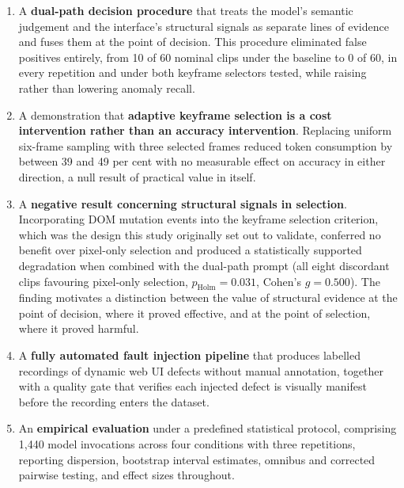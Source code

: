 \begin{enumerate}
  \item A \textbf{dual-path decision procedure} that treats the model's
    semantic judgement and the interface's structural signals as separate
    lines of evidence and fuses them at the point of decision. This
    procedure eliminated false positives entirely, from 10 of 60 nominal
    clips under the baseline to 0 of 60, in every repetition and under
    both keyframe selectors tested, while raising rather than lowering
    anomaly recall.

  \item A demonstration that \textbf{adaptive keyframe selection is a cost
    intervention rather than an accuracy intervention}. Replacing uniform
    six-frame sampling with three selected frames reduced token
    consumption by between 39 and 49 per cent with no measurable effect on
    accuracy in either direction, a null result of practical value in
    itself.

  \item A \textbf{negative result concerning structural signals in
    selection}. Incorporating DOM mutation events into the keyframe
    selection criterion, which was the design this study originally set
    out to validate, conferred no benefit over pixel-only selection and
    produced a statistically supported degradation when combined with the
    dual-path prompt (all eight discordant clips favouring pixel-only
    selection, $p_{\text{Holm}} = 0.031$, Cohen's $g = 0.500$). The
    finding motivates a distinction between the value of structural
    evidence at the point of decision, where it proved effective, and at
    the point of selection, where it proved harmful.

  \item A \textbf{fully automated fault injection pipeline} that produces
    labelled recordings of dynamic web UI defects without manual
    annotation, together with a quality gate that verifies each injected
    defect is visually manifest before the recording enters the dataset.

  \item An \textbf{empirical evaluation} under a predefined statistical
    protocol, comprising 1{,}440 model invocations across four conditions
    with three repetitions, reporting dispersion, bootstrap interval
    estimates, omnibus and corrected pairwise testing, and effect sizes
    throughout.
\end{enumerate}



